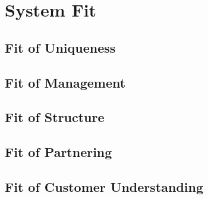 \section{System Fit}
\label{sec:system_fit}

\subsection{Fit of Uniqueness}

\subsection{Fit of Management}

\subsection{Fit of Structure}

\subsection{Fit of Partnering}

\subsection{Fit of Customer Understanding}
